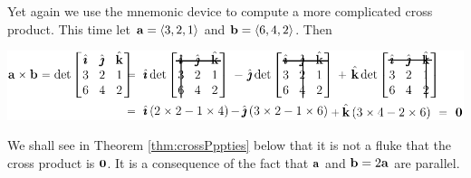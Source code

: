 \begin{eg}\label{eg:GEOcrossEgB}
Yet again we use the mnemonic device to compute a more complicated cross product. This time let $\mathbf{a}=\left< 3,2,1 \right>$ and $\mathbf{b}=\left< 6,4,2 \right>$. Then
      \begin{center}
      \includegraphics{detEgB.pdf}
      \end{center}
We shall see in Theorem \ref{thm:crossPppties}
    below that it is not a fluke that the cross product is $\mathbf{0}$.
It is a consequence of the fact that $\mathbf{a}$ and $\mathbf{b}=2\mathbf{a}$ are parallel. 
\end{eg}

